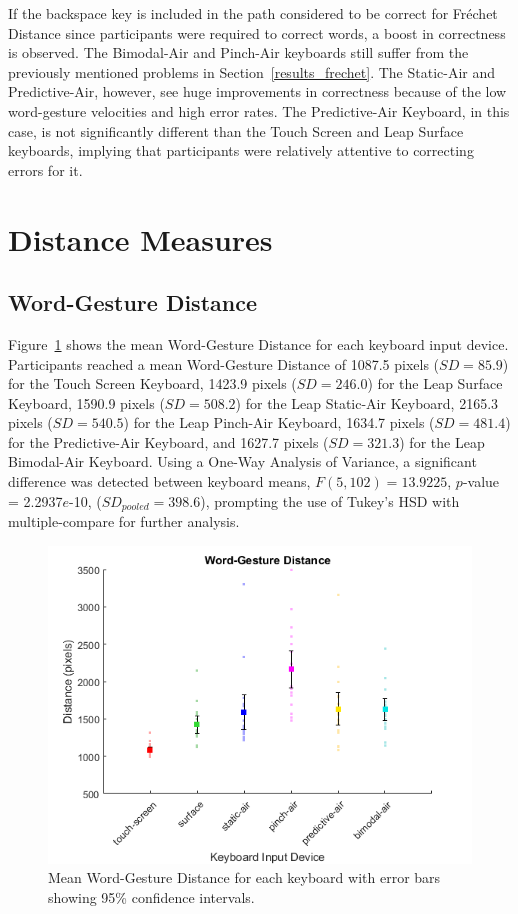 If the backspace key is included in the path considered to be correct for Fr\'echet Distance since participants were required to correct words, a boost in correctness is observed. The Bimodal-Air and Pinch-Air keyboards still suffer from the previously mentioned problems in Section~\ref{results_frechet}. The Static-Air and Predictive-Air, however, see huge improvements in correctness because of the low word-gesture velocities and high error rates. The Predictive-Air Keyboard, in this case, is not significantly different than the Touch Screen and Leap Surface keyboards, implying that participants were relatively attentive to correcting errors for it.

\section{Distance Measures}
\subsection{Word-Gesture Distance} \label{results_distance}
Figure~\ref{fig_distance_mean} shows the mean Word-Gesture Distance for each keyboard input device. Participants reached a mean Word-Gesture Distance of 1087.5 pixels ($SD = 85.9$) for the Touch Screen Keyboard, 1423.9 pixels ($SD = 246.0$) for the Leap Surface Keyboard, 1590.9 pixels ($SD = 508.2$) for the Leap Static-Air Keyboard, 2165.3 pixels ($SD = 540.5$) for the Leap Pinch-Air Keyboard, 1634.7 pixels ($SD = 481.4$) for the Predictive-Air Keyboard, and 1627.7 pixels ($SD = 321.3$) for the Leap Bimodal-Air Keyboard. Using a One-Way Analysis of Variance, a significant difference was detected between keyboard means, $F(5, 102) = 13.9225$, $p$-value = 2.2937$e$-10, ($SD_{pooled} = 398.6$), prompting the use of Tukey's HSD with multiple-compare for further analysis.

\begin{figure}[h]
	\centering
	\includegraphics{fig_distance_mean}
	\caption[Mean Word-Gesture Distance]{Mean Word-Gesture Distance for each keyboard with error bars showing 95\% confidence intervals.}
	\label{fig_distance_mean}
\end{figure}


